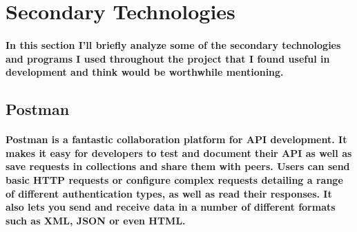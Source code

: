 \section{Secondary Technologies}
\paragraph{In this section I'll briefly analyze some of the secondary technologies and programs I used throughout the project that I found useful in development and think would be worthwhile mentioning.}
\subsection{Postman}
\paragraph{Postman is a fantastic collaboration platform for API development. It makes it easy for developers to test and document their API as well as save requests in collections and share them with peers. Users can send basic HTTP requests or configure complex requests detailing a range of different authentication types, as well as read their responses. It also lets you send and receive data in a number of different formats such as XML, JSON or even HTML.}
